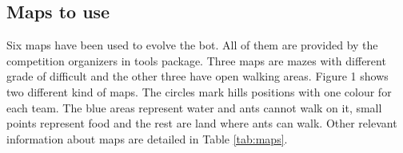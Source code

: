 \documentclass[runningheads]{llncs}
\begin{document}
 
 
 
 



\subsection{Maps to use}
Six maps have been used to evolve the bot. All of them are provided by the competition organizers in tools package. Three maps are mazes with different grade of difficult and the other three have open walking areas. Figure 1 %
 shows two different kind of maps. The circles mark hills positions with one colour for each team. The blue areas represent water and ants cannot walk on it, small points represent food and the rest are land where ants can walk. Other relevant information about maps are detailed in Table \ref{tab:maps}. 





\end{document}
